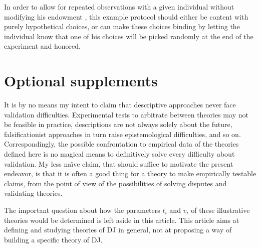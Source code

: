 \documentclass[version=last, pagesize, twoside=off, bibliography=totoc, DIV=calc, fontsize=12pt, a4paper, french, english]{scrartcl}
\begin{document}
In order to allow for repeated observations with a given individual without modifying his endowment , this example protocol should either be content with purely hypothetical choices, or can make these choices binding by letting the individual know that one of his choices will be picked randomly at the end of the experiment and honored.



\section{Optional supplements}
It is by no means my intent to claim that descriptive approaches never face validation difficulties. Experimental tests to arbitrate between theories may not be feasible in practice, descriptions are not always solely about the future, falsificationist approaches in turn raise epistemological difficulties, and so on. Correspondingly, the possible confrontation to empirical data of the theories defined here is no magical means to definitively solve every difficulty about validation. My less naïve claim, that should suffice to motivate the present endeavor, is that it is often a good thing for a theory to make empirically testable claims, from the point of view of the possibilities of solving disputes and validating theories.

The important question about how the parameters $t_i$ and $v_i$ of these illustrative theories would be determined is left aside in this article. This article aims at defining and studying theories of \ac{DJ} in general, not at proposing a way of building a specific theory of \ac{DJ}. %
\end{document}
